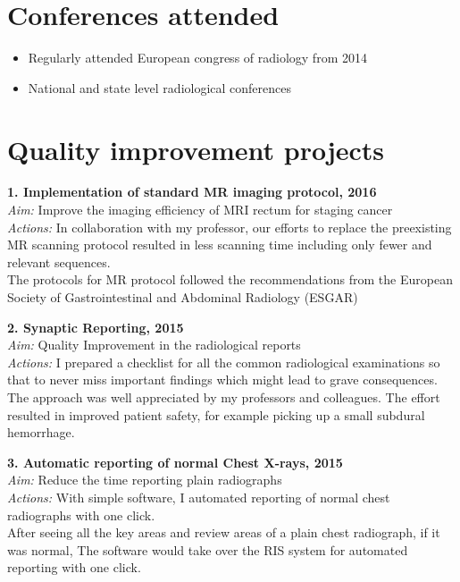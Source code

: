 \documentclass[a4paper,10pt]{article}
\begin{document}
\section{Conferences attended}
\begin{itemize}
  \item Regularly attended European congress of radiology  from 2014
  \vspace{-0.2cm}\item National and state level radiological conferences
\end{itemize}

\section{Quality improvement projects}
\textbf{1. Implementation of standard MR imaging protocol, 2016}\\
\textit{Aim:} Improve the imaging efficiency of MRI rectum for staging cancer\\
\textit{Actions:} In collaboration with my professor, our efforts to replace the preexisting MR scanning protocol resulted in less scanning time including only fewer and relevant sequences.\\
The protocols for MR protocol followed the recommendations from the
European Society of Gastrointestinal and Abdominal Radiology (ESGAR)\\
\vspace{3mm}

\textbf{2. Synaptic Reporting, 2015}\\
\textit{Aim:} Quality Improvement in the radiological reports\\
\textit{Actions:} I prepared a checklist for all the common radiological examinations so that to never miss important findings which might lead to grave consequences.\\
The approach was well appreciated by my professors and colleagues. The effort resulted in improved patient safety, for example picking up a small subdural hemorrhage.\\
\vspace{3mm}

\textbf{3. Automatic reporting of normal Chest X-rays, 2015}\\
\textit{Aim:} Reduce the time reporting plain radiographs\\
\textit{Actions:} With simple software, I automated reporting of normal chest radiographs with one click.\\
After seeing all the key areas and review areas of a plain chest radiograph, if it was normal, The software would take over the RIS system for automated reporting with one click.\\
\end{document}
